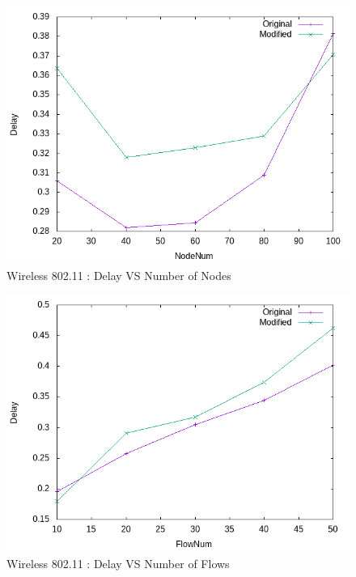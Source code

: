     \begin{figure}[!h] 
        \centering
        \includegraphics[width=.8\textwidth]{Pictures/Wireless802.11Mobile/Combined/DelayVSNodeNum.png}
         \caption{Wireless 802.11 : Delay VS Number of Nodes}
    \end{figure}
    
     \begin{figure}[!h] 
        \centering
        \includegraphics[width=.8\textwidth]{Pictures/Wireless802.11Mobile/Combined/DelayVSFlowNum.png}
         \caption{Wireless 802.11 : Delay VS Number of Flows}
    \end{figure}
    
